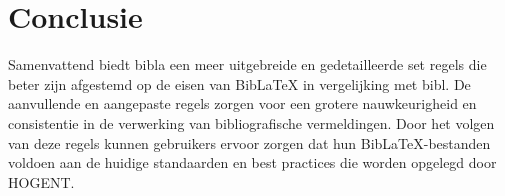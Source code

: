
\chapter{Conclusie}%
\label{ch:conclusie}





Samenvattend biedt bibla een meer uitgebreide en gedetailleerde set regels die beter zijn afgestemd op de eisen van BibLaTeX in vergelijking met bibl. De aanvullende en aangepaste regels zorgen voor een grotere nauwkeurigheid en consistentie in de verwerking van bibliografische vermeldingen. Door het volgen van deze regels kunnen gebruikers ervoor zorgen dat hun BibLaTeX-bestanden voldoen aan de huidige standaarden en best practices die worden opgelegd door HOGENT.